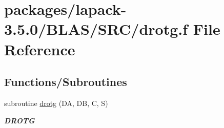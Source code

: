 \hypertarget{lapack-3_85_80_2BLAS_2SRC_2drotg_8f}{}\section{packages/lapack-\/3.5.0/\+B\+L\+A\+S/\+S\+R\+C/drotg.f File Reference}
\label{lapack-3_85_80_2BLAS_2SRC_2drotg_8f}
\subsection*{Functions/\+Subroutines}
\begin{DoxyCompactItemize}
\item 
subroutine \hyperlink{group__double__blas__level1_gacb41f9f4a646322165fcc7313b9024bf}{drotg} (D\+A, D\+B, C, S)
\begin{DoxyCompactList}\small\item\em {\bfseries D\+R\+O\+T\+G} \end{DoxyCompactList}\end{DoxyCompactItemize}
